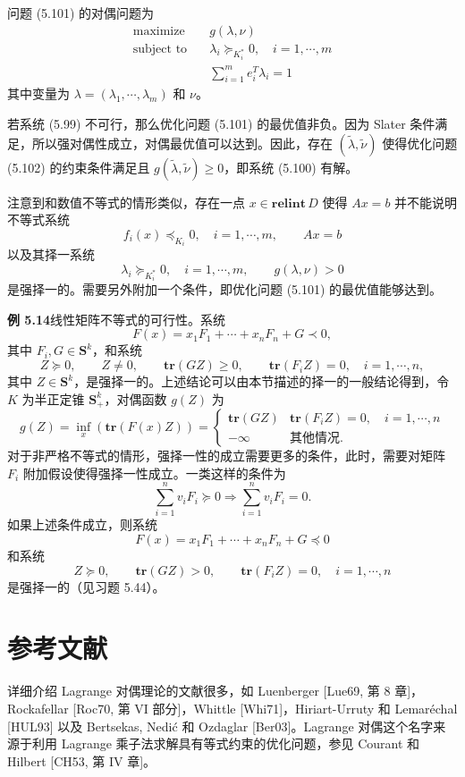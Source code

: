 \documentclass[UTF8, 12pt, fontset=fandol, oneside]{ctexart}
\begin{document}
问题 (5.101) 的对偶问题为
\begin{equation}
\begin{aligned}
\text{maximize}\quad & g(\lambda,\nu)\\
\text{subject to}\quad & \lambda_i\succeq_{K_i^\ast}0,\quad i=1,\cdots,m\\
& \sum_{i=1}^m e_i^T\lambda_i=1
\end{aligned}
\tag{5.102}
\end{equation}
其中变量为 $\lambda=(\lambda_1,\cdots,\lambda_m)$ 和 $\nu$。

若系统 (5.99) 不可行，那么优化问题 (5.101) 的最优值非负。因为 Slater 条件满足，所以强对偶性成立，对偶最优值可以达到。因此，存在 $(\tilde{\lambda},\tilde{\nu})$ 使得优化问题 (5.102) 的约束条件满足且 $g(\tilde{\lambda},\tilde{\nu})\geq 0$，即系统 (5.100) 有解。

注意到和数值不等式的情形类似，存在一点 $x\in\mathbf{relint}\,D$ 使得 $Ax=b$ 并不能说明不等式系统
\[
f_i(x)\preceq_{K_i}0,\quad i=1,\cdots,m,\qquad Ax=b
\]
以及其择一系统
\[
\lambda_i\succeq_{K_i^\ast}0,\quad i=1,\cdots,m,\qquad g(\lambda,\nu)>0
\]
是强择一的。需要另外附加一个条件，即优化问题 (5.101) 的最优值能够达到。

\noindent\textbf{例 5.14}\quad 线性矩阵不等式的可行性。系统
\[
F(x)=x_1F_1+\cdots+x_nF_n+G\prec 0,
\]
其中 $F_i,G\in\mathbf{S}^k$，和系统
\[
Z\succeq 0,\qquad Z\neq 0,\qquad \mathbf{tr}(GZ)\geq 0,\qquad \mathbf{tr}(F_iZ)=0,\quad i=1,\cdots,n,
\]
其中 $Z\in\mathbf{S}^k$，是强择一的。上述结论可以由本节描述的择一的一般结论得到，令 $K$ 为半正定锥 $\mathbf{S}_+^k$，对偶函数 $g(Z)$ 为
\[
g(Z)=\inf_x(\mathbf{tr}(F(x)Z))=
\begin{cases}
\mathbf{tr}(GZ) & \mathbf{tr}(F_iZ)=0,\quad i=1,\cdots,n\\
-\infty & \text{其他情况}.
\end{cases}
\]
对于非严格不等式的情形，强择一性的成立需要更多的条件，此时，需要对矩阵 $F_i$ 附加假设使得强择一性成立。一类这样的条件为
\[
\sum_{i=1}^n v_iF_i\succeq 0\Longrightarrow \sum_{i=1}^n v_iF_i=0.
\]
如果上述条件成立，则系统
\[
F(x)=x_1F_1+\cdots+x_nF_n+G\preceq 0
\]
和系统
\[
Z\succeq 0,\qquad \mathbf{tr}(GZ)>0,\qquad \mathbf{tr}(F_iZ)=0,\quad i=1,\cdots,n
\]
是强择一的（见习题 5.44）。

\section*{参考文献}

详细介绍 Lagrange 对偶理论的文献很多，如 Luenberger [Lue69, 第 8 章]，Rockafellar [Roc70, 第 VI 部分]，Whittle [Whi71]，Hiriart-Urruty 和 Lemaréchal [HUL93] 以及 Bertsekas, Nedić 和 Ozdaglar [Ber03]。Lagrange 对偶这个名字来源于利用 Lagrange 乘子法求解具有等式约束的优化问题，参见 Courant 和 Hilbert [CH53, 第 IV 章]。
\end{document}
